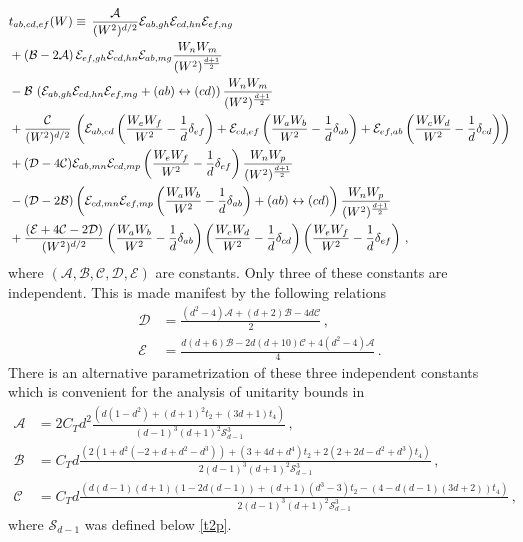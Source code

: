 \documentclass[12pt]{article}
\numberwithin{equation}{section}
\newcommand{\ssc}{\scriptscriptstyle}
\newcommand{\ctt}{C_{\ssc T}}
\begin{document}
\begin{align}\label{ititis}
&t_{ab,cd,ef}(W)\equiv\,\frac{\mathcal{A}}{(W^2)^{d/2}} \mathcal{E}_{ab,gh} \mathcal{E}_{cd,hn} \mathcal{E}_{ef,ng}\\ \notag 
&+(\mathcal{B}-2\mathcal{A}) \, \mathcal{E}_{ef,gh} \mathcal{E}_{cd,hn} \mathcal{E}_{ab,mg}\frac{W_n W_m}{(W^2)^{\frac{d+1}{2}}}\\ \notag 
&-\mathcal{B}\, \left(\mathcal{E}_{ab,gh} \mathcal{E}_{cd,hn} \mathcal{E}_{ef,mg}+(ab)\leftrightarrow (cd)\right)\frac{W_n W_m}{(W^2)^{\frac{d+1}{2}}}\\ \notag 
&+\frac{\mathcal{C}}{(W^2)^{d/2}}\, \left(\mathcal{E}_{ab,cd}\left(\frac{W_eW_f}{W^2}-\frac{1}{d}\delta_{ef} \right)+  \mathcal{E}_{cd,ef}\left(\frac{W_aW_b}{W^2}-\frac{1}{d}\delta_{ab} \right)+
 \mathcal{E}_{ef,ab}\left(\frac{W_cW_d}{W^2}-\frac{1}{d}\delta_{cd} \right)
\right)\\ \notag
&+(\mathcal{D}-4\mathcal{C})\mathcal{E}_{ab,mn} \mathcal{E}_{cd,mp} \left(\frac{W_eW_f}{W^2}-\frac{1}{d}\delta_{ef}  \right)\frac{W_n W_p}{(W^2)^{\frac{d+1}{2}}}\\ \notag 
&-(\mathcal{D}-2\mathcal{B}) \left(\mathcal{E}_{cd,mn} \mathcal{E}_{ef,mp} \left(\frac{W_aW_b}{W^2}-\frac{1}{d}\delta_{ab}  \right)+ (ab)\leftrightarrow (cd) \right)\frac{W_n W_p}{(W^2)^{\frac{d+1}{2}}}\\ \notag
&+\frac{(\mathcal{E}+4\mathcal{C}-2\mathcal{D})}{(W^2)^{d/2}} \left(\frac{W_aW_b}{W^2}-\frac{1}{d}\delta_{ab}  \right)\left(\frac{W_cW_d}{W^2}-\frac{1}{d}\delta_{cd}  \right)\left(\frac{W_eW_f}{W^2}-\frac{1}{d}\delta_{ef}  \right)\,,
\end{align}
%
where $(\mathcal{A},\mathcal{B},\mathcal{C},\mathcal{D},\mathcal{E})$ are constants. Only three of these constants are independent. This is made manifest by the following relations 
%
\begin{equation}
\begin{split}
\mathcal{D}&=\frac{(d^2-4)\mathcal{A}+(d+2)\mathcal{B}-4d \mathcal{C}}{2}\, ,\\ 
\mathcal{E}&=\frac{d(d+6)\mathcal{B}-2d(d+10)\mathcal{C}+4(d^2-4)\mathcal{A}}{4}\,.
\end{split}
\end{equation}
%
There is an alternative parametrization of these three independent constants which is convenient for the analysis of unitarity bounds in \cite{Hofman:2008ar}
%
\begin{equation}
\begin{split}
\mathcal{A}&=2\ctt d^2\frac{(d(1-d^2)+(d+1)^2t_2+(3d+1)t_4)}{(d-1)^3(d+1)^2\mathcal{S}_{d-1}^3}\, ,\\ 
\mathcal{B}&=\ctt  d\frac{(2(1+d^2(-2+d+d^2-d^3))+(3+4d+d^4)t_2+2(2+2d-d^2+d^3)t_4)}{2(d-1)^3(d+1)^2\mathcal{S}_{d-1}^3}\,,\\
\mathcal{C}&=\ctt  d \frac{(d(d-1)(d+1)(1-2d(d-1))+(d+1)(d^3-3)t_2-(4-d(d-1)(3d+2))t_4)}{2(d-1)^3(d+1)^2\mathcal{S}_{d-1}^3}\,,
\end{split}
\end{equation}
%
where $\mathcal{S}_{d-1}$ was defined below \eqref{t2p}. 
\end{document}
